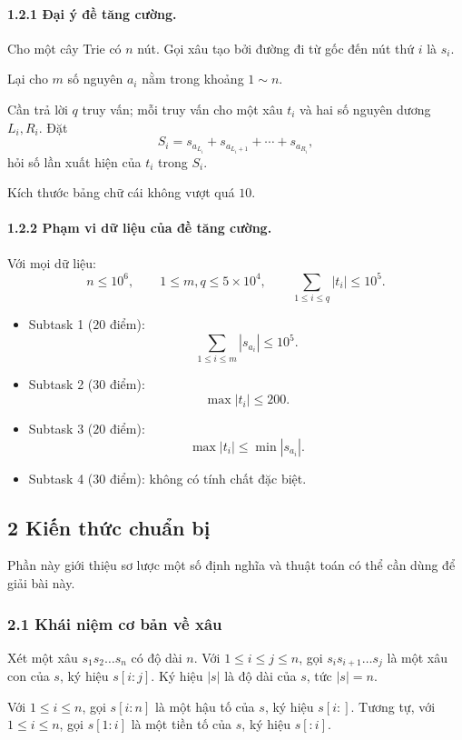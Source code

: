 \documentclass[11pt]{article}
\begin{document}
\paragraph{1.2.1 Đại ý đề tăng cường.}
Cho một cây Trie có \(n\) nút. Gọi xâu tạo bởi đường đi từ gốc đến nút thứ \(i\)
là \(s_i\).

Lại cho \(m\) số nguyên \(a_i\) nằm trong khoảng \(1\sim n\).

Cần trả lời \(q\) truy vấn; mỗi truy vấn cho một xâu \(t_i\) và hai số nguyên
dương \(L_i,R_i\). Đặt
\[
  S_i=s_{a_{L_i}}+s_{a_{L_i+1}}+\cdots+s_{a_{R_i}},
\]
hỏi số lần xuất hiện của \(t_i\) trong \(S_i\).

Kích thước bảng chữ cái không vượt quá \(10\).

\paragraph{1.2.2 Phạm vi dữ liệu của đề tăng cường.}
Với mọi dữ liệu:
\[
  n\le 10^6,\qquad 1\le m,q\le 5\times 10^4,\qquad
  \sum_{1\le i\le q}|t_i|\le 10^5.
\]

\begin{itemize}
  \item Subtask 1 (\(20\) điểm):
  \[
    \sum_{1\le i\le m}|s_{a_i}|\le 10^5.
  \]
  \item Subtask 2 (\(30\) điểm):
  \[
    \max |t_i|\le 200.
  \]
  \item Subtask 3 (\(20\) điểm):
  \[
    \max |t_i|\le \min |s_{a_i}|.
  \]
  \item Subtask 4 (\(30\) điểm): không có tính chất đặc biệt.
\end{itemize}

\subsection*{2 Kiến thức chuẩn bị}

Phần này giới thiệu sơ lược một số định nghĩa và thuật toán có thể cần dùng để
giải bài này.

\subsubsection*{2.1 Khái niệm cơ bản về xâu}

Xét một xâu \(s_1s_2\ldots s_n\) có độ dài \(n\). Với
\(1\le i\le j\le n\), gọi \(s_is_{i+1}\ldots s_j\) là một xâu con của \(s\),
ký hiệu \(s[i:j]\). Ký hiệu \(|s|\) là độ dài của \(s\), tức \(|s|=n\).

Với \(1\le i\le n\), gọi \(s[i:n]\) là một hậu tố của \(s\), ký hiệu
\(s[i:]\). Tương tự, với \(1\le i\le n\), gọi \(s[1:i]\) là một tiền tố của
\(s\), ký hiệu \(s[:i]\).
\end{document}
